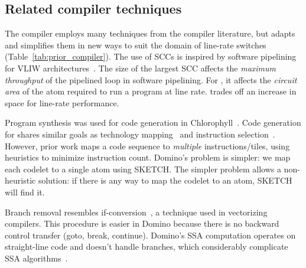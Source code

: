 \subsection{Related compiler techniques}
\label{ss:related_compiler}

The \pktlanguage compiler employs many techniques from the compiler literature,
but adapts and simplifies them in new ways to suit the domain of line-rate
switches (Table~\ref{tab:prior_compiler}). The use of SCCs is inspired by
software pipelining for VLIW architectures~\cite{software_pipelining, rau}. The size
of the largest SCC affects the {\em maximum throughput} of the pipelined loop
in software pipelining. For \pktlanguage, it affects the {\em circuit area} of
the atom required to run a program at line rate. \pktlanguage trades off an
increase in space for line-rate performance.

Program synthesis was used for code generation in
Chlorophyll~\cite{chlorophyll}.  Code generation for \pktlanguage shares
similar goals as technology mapping~\cite{micheli, flowmap, spectransform} and
instruction selection~\cite{muchnik}.  However, prior work maps a code sequence
to \textit{multiple} instructions/tiles, using heuristics to minimize
instruction count. Domino's problem is simpler: we map each codelet to a single
atom using SKETCH.  The simpler problem allows a non-heuristic solution: if
there is any way to map the codelet to an atom, SKETCH will find it.

Branch removal resembles if-conversion~\cite{if_conversion}, a
technique used in vectorizing compilers. This procedure is easier in Domino
because there is no backward control transfer (goto, break,
continue). Domino's SSA computation operates on straight-line code and doesn't
 handle branches, which considerably complicate SSA algorithms~\cite{ssa}.

